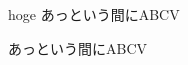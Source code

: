 \documentclass{article}
\begin{document}
hoge %
\noindent
\shipout\vbox{\tate あっという間にABCV}

\par %
\shipout\vbox{\tate あっという間にABCV}
\stop
\end{document}
